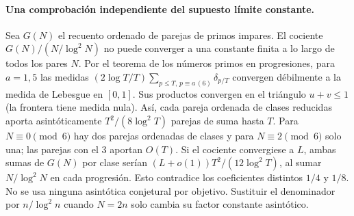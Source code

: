 \documentclass[11pt,a4paper]{article}
\newcommand{\B}[2]{#2}
\newcommand{\B}[2]{#1}
\begin{document}
\paragraph{\B{An independent test of the constant-limit claim.}{Una comprobación independiente del supuesto límite constante.}}
\B{Let $G(N)$ count ordered odd-prime pairs. The ratio $G(N)/(N/\log^2 N)$ cannot converge to a finite constant along all even $N$. By the prime number theorem in arithmetic progressions, for $a=1,5$ the measures $(2\log T/T)\sum_{p\le T,\,p\equiv a\,(6)}\delta_{p/T}$ converge weakly to Lebesgue measure on $[0,1]$. Products converge on the triangle $u+v\le1$ (its boundary has measure zero). Thus each ordered pair of reduced classes contributes asymptotically $T^2/(8\log^2 T)$ pairs of sum at most $T$. For $N\equiv0\pmod6$ there are two such ordered class pairs, and for $N\equiv2\pmod6$ only one; pairs involving 3 contribute $O(T)$. If the ratio converged to $L$, the two sums of $G(N)$ over these classes would both equal $(L+o(1))T^2/(12\log^2 T)$, by summing $N/\log^2 N$ on each progression. This contradicts the unequal coefficients $1/4$ and $1/8$. No conjectural asymptotic for individual targets is used. Replacing the denominator by $n/\log^2 n$ at $N=2n$ changes only its asymptotic constant factor.}{Sea $G(N)$ el recuento ordenado de parejas de primos impares. El cociente $G(N)/(N/\log^2 N)$ no puede converger a una constante finita a lo largo de todos los pares $N$. Por el teorema de los números primos en progresiones, para $a=1,5$ las medidas $(2\log T/T)\sum_{p\le T,\,p\equiv a\,(6)}\delta_{p/T}$ convergen débilmente a la medida de Lebesgue en $[0,1]$. Sus productos convergen en el triángulo $u+v\le1$ (la frontera tiene medida nula). Así, cada pareja ordenada de clases reducidas aporta asintóticamente $T^2/(8\log^2 T)$ parejas de suma hasta $T$. Para $N\equiv0\pmod6$ hay dos parejas ordenadas de clases y para $N\equiv2\pmod6$ solo una; las parejas con el 3 aportan $O(T)$. Si el cociente convergiese a $L$, ambas sumas de $G(N)$ por clase serían $(L+o(1))T^2/(12\log^2 T)$, al sumar $N/\log^2 N$ en cada progresión. Esto contradice los coeficientes distintos $1/4$ y $1/8$. No se usa ninguna asintótica conjetural por objetivo. Sustituir el denominador por $n/\log^2 n$ cuando $N=2n$ solo cambia su factor constante asintótico.}
\end{document}
